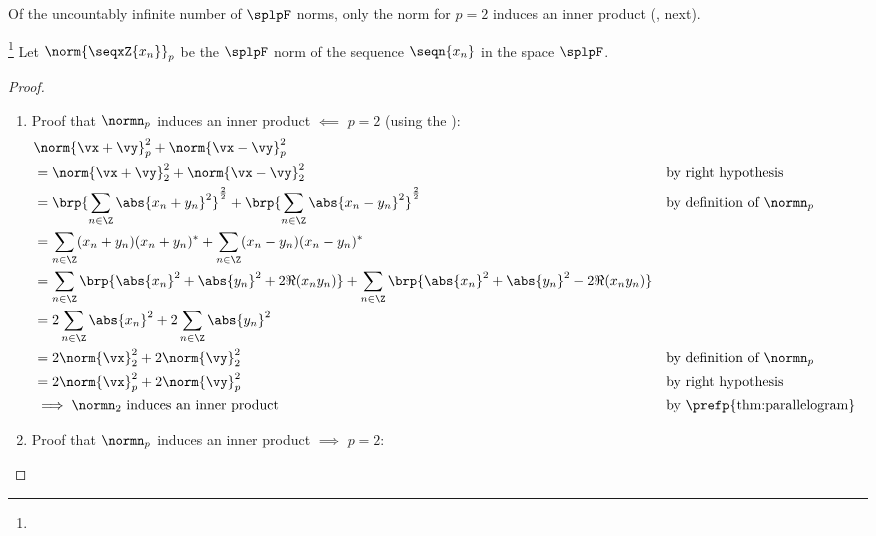 Of the uncountably infinite number of $\splpF$ norms, only the norm for $p=2$ induces an inner product
(, next).
\begin{proposition}
\footnote{
  }
\label{prop:lp_norm2ip}
Let $\norm{\seqxZ{x_n}}_p$ be the $\splpF$ norm of the sequence $\seqn{x_n}$ in the space $\splpF$.
\end{proposition}
\begin{proof}
\begin{enumerate}
  \item Proof that $\normn_p$ induces an inner product $\impliedby$ $p=2$
        (using the  ):
    \begin{align*}
      &\norm{\vx+\vy}_p^2 + \norm{\vx-\vy}_p^2 
      \\&= \norm{\vx+\vy}_2^2 + \norm{\vx-\vy}_2^2 
        && \text{by right hypothesis}
      \\&= \brp{\sum_{n\in\Z} \abs{x_n+y_n}^2}^\frac{2}{2} +
           \brp{\sum_{n\in\Z} \abs{x_n-y_n}^2}^\frac{2}{2}
        && \text{by definition of $\normn_p$}
      \\&= \sum_{n\in\Z} (x_n+y_n)(x_n+y_n)^\ast +
           \sum_{n\in\Z} (x_n-y_n)(x_n-y_n)^\ast
      \\&= \sum_{n\in\Z} \brp{\abs{x_n}^2 + \abs{y_n}^2 + 2\Re(x_ny_n)} +
           \sum_{n\in\Z} \brp{\abs{x_n}^2 + \abs{y_n}^2 - 2\Re(x_ny_n)} 
      \\&= 2\sum_{n\in\Z} \abs{x_n}^2 + 2\sum_{n\in\Z}\abs{y_n}^2 
      \\&= 2\norm{\vx}_2^2 + 2\norm{\vy}_2^2 
        && \text{by definition of $\normn_p$}
      \\&= 2\norm{\vx}_p^2 + 2\norm{\vy}_p^2 
        && \text{by right hypothesis}
      \\&\implies \text{$\normn_2$ induces an inner product}
        && \text{by \prefp{thm:parallelogram}}
    \end{align*}

  \item Proof that $\normn_p$ induces an inner product $\implies$ $p=2$:
    \begin{enumerate}


\end{enumerate}
\end{enumerate}
\end{proof}
